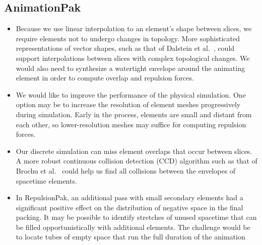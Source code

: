 \subsection{AnimationPak}


\begin{itemize}
\item {}
Because we use linear interpolation to  an element's shape
	between slices, we require elements not to undergo changes in 
	topology.  More sophisticated representations of vector shapes,
	such as that of Dalstein et al.~\cite{Dalstein2015}, could support
	interpolations between slices with complex topological changes.
	We would also need to synthesize a watertight envelope around the
	animating element in order to compute overlap and repulsion forces.

\item {}
We would like to improve the performance of the physical simulation.
	One option may be to increase the resolution of element meshes 
	progressively during simulation.  Early in the process, elements are
	small and distant from each other, so lower-resolution
	meshes may suffice for computing repulsion forces.

\item {}
	Our discrete simulation can miss element overlaps that occur between
	slices.  A more robust continuous collision detection (CCD) algorithm
	such as that of Brochu et al.~\cite{Brochu2012}
	could help us find all collisions between
	the envelopes of spacetime elements.

\item {}
In RepulsionPak, an additional pass with
	small secondary elements had a significant positive effect on the
	distribution of negative space in the final packing.  It may be
	possible to identify stretches of unused spacetime that can be filled
	opportunistically with additional elements.  The challenge would be
	to locate tubes of empty space that run the full duration of the animation


\end{itemize}
